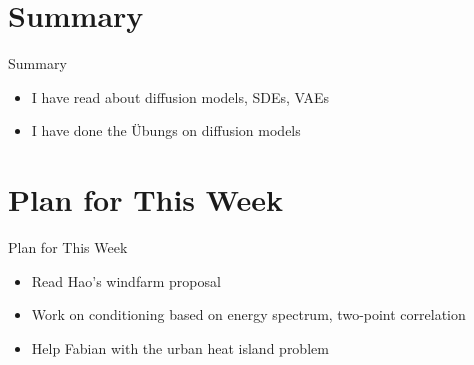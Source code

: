 \documentclass[./main.tex]{subfiles}
\begin{document}
\section{Summary}
\label{sec:org89ae61b}
\begin{frame}[label={sec:org7b8dd0c}]{Summary}
\begin{itemize}
\item I have read about diffusion models, SDEs, VAEs
\item I have done the Übungs on diffusion models
\end{itemize}
\end{frame}

\section{Plan for This Week}
\label{sec:org685f34f}
\begin{frame}[label={sec:org7a954be}]{Plan for This Week}
\begin{itemize}
\item Read Hao's windfarm proposal
\item Work on conditioning based on energy spectrum, two-point correlation
\item Help Fabian with the urban heat island problem
\end{itemize}
\end{frame}
\end{document}
